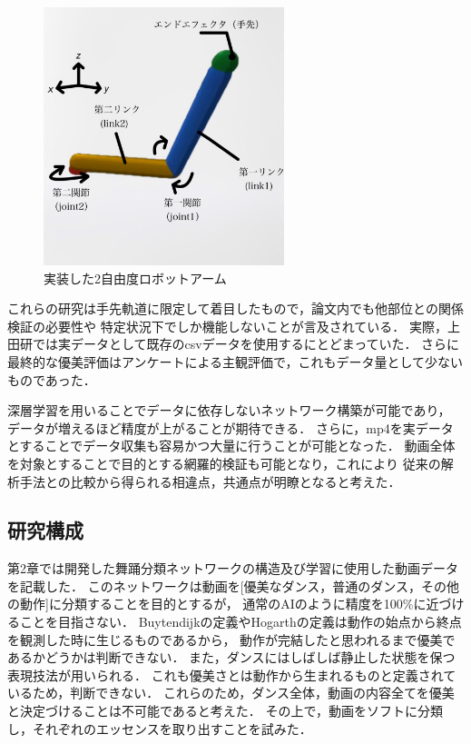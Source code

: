 \begin{figure}[b]
  \begin{center}
    \includegraphics[width=70mm]{images/robot_arm.png}
  \end{center}
  \caption{実装した2自由度ロボットアーム}
  \label{robot_arm}
\end{figure}
\clearpage

これらの研究は手先軌道に限定して着目したもので，論文内でも他部位との関係検証の必要性や
特定状況下でしか機能しないことが言及されている．
実際，上田研では実データとして既存のcsvデータを使用するにとどまっていた．
さらに最終的な優美評価はアンケートによる主観評価で，これもデータ量として少ないものであった．

深層学習を用いることでデータに依存しないネットワーク構築が可能であり，
データが増えるほど精度が上がることが期待できる．
さらに，mp4を実データとすることでデータ収集も容易かつ大量に行うことが可能となった．
動画全体を対象とすることで目的とする網羅的検証も可能となり，これにより
従来の解析手法との比較から得られる相違点，共通点が明瞭となると考えた．

\subsection{研究構成}
第2章では開発した舞踊分類ネットワークの構造及び学習に使用した動画データを記載した．
このネットワークは動画を[優美なダンス，普通のダンス，その他の動作]に分類することを目的とするが，
通常のAIのように精度を100\%に近づけることを目指さない．
Buytendijkの定義やHogarthの定義は動作の始点から終点を観測した時に生じるものであるから，
動作が完結したと思われるまで優美であるかどうかは判断できない．
また，ダンスにはしばしば静止した状態を保つ表現技法が用いられる．
これも優美さとは動作から生まれるものと定義されているため，判断できない．
これらのため，ダンス全体，動画の内容全てを優美と決定づけることは不可能であると考えた．
その上で，動画をソフトに分類し，それぞれのエッセンスを取り出すことを試みた．

